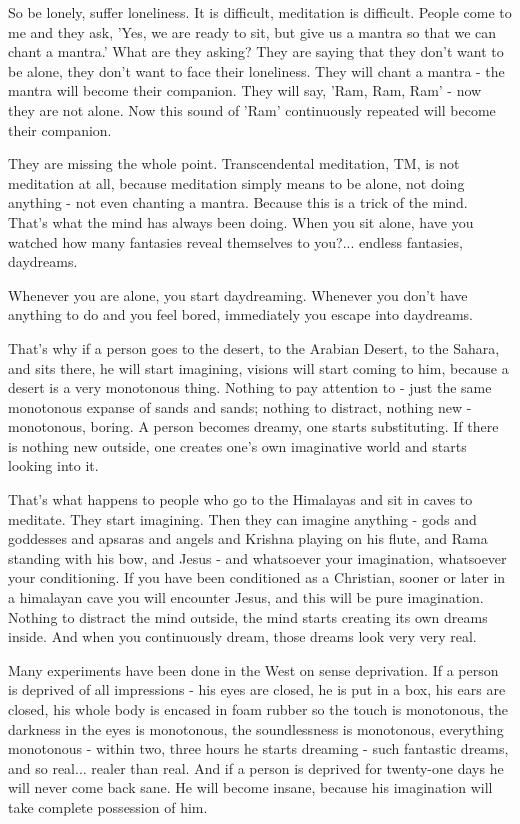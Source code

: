 So be lonely, suffer loneliness. It is difficult, meditation is difficult. People come to me and they ask, 'Yes, we are ready to sit, but give us a mantra so that we can chant a mantra.' What are they asking? They are saying that they don't want to be alone, they don't want to face their loneliness. They will chant a mantra - the mantra will become their companion. They will say, 'Ram, Ram, Ram' - now they are not alone. Now this sound of 'Ram' continuously repeated will become their companion.

They are missing the whole point. Transcendental meditation, TM, is not meditation at all, because meditation simply means to be alone, not doing anything - not even chanting a mantra. Because this is a trick of the mind. That's what the mind has always been doing. When you sit alone, have you watched how many fantasies reveal themselves to you?... endless fantasies, daydreams.

Whenever you are alone, you start daydreaming. Whenever you don't have anything to do and you feel bored, immediately you escape into daydreams.

That's why if a person goes to the desert, to the Arabian Desert, to the Sahara, and sits there, he will start imagining, visions will start coming to him, because a desert is a very monotonous thing. Nothing to pay attention to - just the same monotonous expanse of sands and sands; nothing to distract, nothing new - monotonous, boring. A person becomes dreamy, one starts substituting. If there is nothing new outside, one creates one's own imaginative world and starts looking into it.

That's what happens to people who go to the Himalayas and sit in caves to meditate. They start imagining. Then they can imagine anything - gods and goddesses and apsaras and angels and Krishna playing on his flute, and Rama standing with his bow, and Jesus - and whatsoever your imagination, whatsoever your conditioning. If you have been conditioned as a Christian, sooner or later in a himalayan cave you will encounter Jesus, and this will be pure imagination. Nothing to distract the mind outside, the mind starts creating its own dreams inside. And when you continuously dream, those dreams look very very real.

Many experiments have been done in the West on sense deprivation. If a person is deprived of all impressions - his eyes are closed, he is put in a box, his ears are closed, his whole body is encased in foam rubber so the touch is monotonous, the darkness in the eyes is monotonous, the soundlessness is monotonous, everything monotonous - within two, three hours he starts dreaming - such fantastic dreams, and so real... realer than real. And if a person is deprived for twenty-one days he will never come back sane. He will become insane, because his imagination will take complete possession of him.

